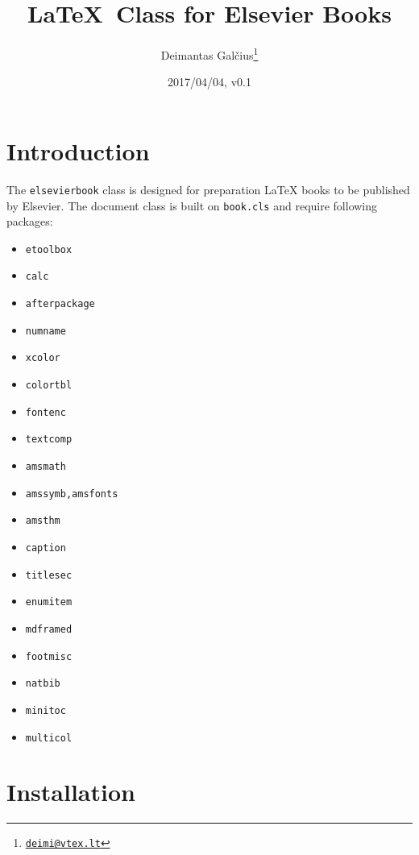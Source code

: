 \documentclass{ltxdoc}
\def\file#1{\texttt{#1}}
\begin{document}
\title{\LaTeX\ Class for Elsevier Books}
\author{Deimantas Gal\v{c}ius\footnote{\href{mailto:deimi@vtex.lt}{\texttt{deimi@vtex.lt}}}}
\date{2017/04/04, v0.1}
\maketitle
{}



\tableofcontents

\section{Introduction}

The \file{elsevierbook} class is designed for preparation \LaTeX{} books to be published by Elsevier. 
The document class is built on \file{book.cls} and require following packages:

\begin{multicols}{2}
\begin{itemize}
\item \file{etoolbox}
\item \file{calc}
\item \file{afterpackage}
\item \file{numname}
\item \file{xcolor}
\item \file{colortbl}
\item \file{fontenc}
\item \file{textcomp}
\item \file{amsmath}
\item \file{amssymb,amsfonts}
\item \file{amsthm}
\item \file{caption}
\item \file{titlesec}
\item \file{enumitem}
\item \file{mdframed}
\item \file{footmisc}
\item \file{natbib}
\item \file{minitoc}
\item \file{multicol}
\end{itemize}
\end{multicols}

\section{Installation}
\end{document}
